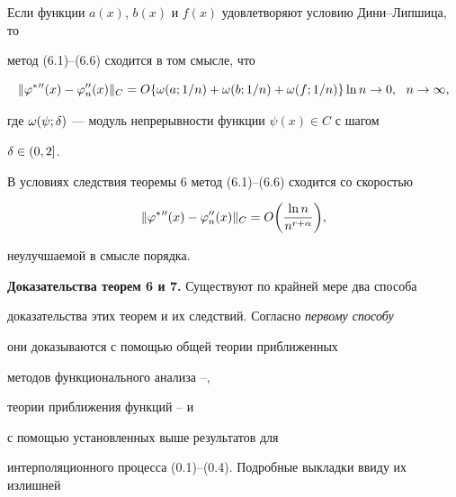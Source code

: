 \setcounter{cor}{0}





\begin{cor}


Если функции $a(x)$, $b(x)$ и $f(x)$ удовлетворяют условию Дини--Липшица, то


метод (6.1)--(6.6) сходится в том смысле, что


$$


\|\vp^*{}''(x)-\vp_n''(x)\|_C=O\{\omega(a;1/n)+\omega(b;1/n)+\omega(f;1/n)\}\ln n


\rightarrow 0,\ \ n\rightarrow \infty ,


$$


где $\omega(\psi;\delta)$ --- модуль непрерывности функции $\psi(x)\in C$ с шагом


$\delta\in (0,2]$.


\end{cor}








\begin{cor}


В условиях следствия теоремы 6 метод (6.1)--(6.6) сходится со скоростью


\begin{equation}


\|\vp^*{}''(x)-\vp_n''(x)\|_C=O\bigg(\frac{\ln n}{n^{r+\al}}\bigg),


\end{equation}


неулучшаемой в смысле порядка.


\end{cor}








{\bf Доказательства теорем 6 и 7.} Существуют по крайней мере два способа 


доказательства этих теорем и их следствий. Согласно {\it первому способу} 


они доказываются с помощью общей теории приближенных


методов функционального анализа \cite{2}--\cite{11},


теории приближения функций \cite{7}--\cite{15} и


с помощью установленных выше результатов для


интерполяционного процесса (0.1)--(0.4). Подробные выкладки ввиду их излишней 


